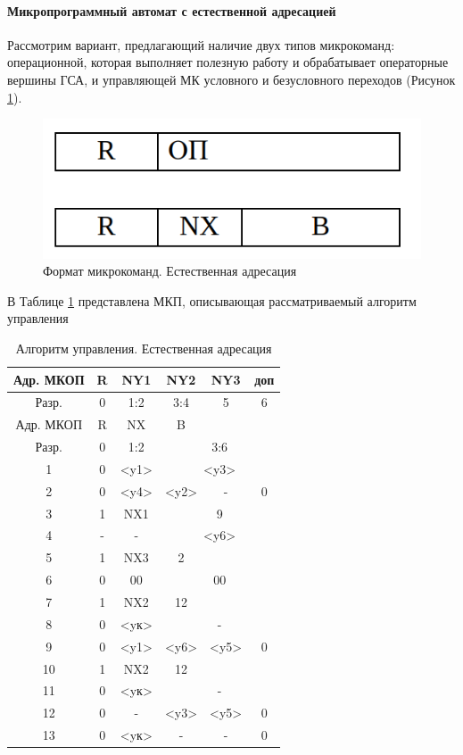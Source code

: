 \documentclass[a4paper,14pt]{extarticle}
\begin{document}
	
	\newpage
	\paragraph{Микропрограммный автомат с естественной адресацией}
	Рассмотрим вариант, предлагающий наличие двух типов микрокоманд: операционной, которая выполняет полезную работу и обрабатывает операторные
	вершины ГСА, и управляющей МК условного и безусловного переходов (Рисунок \ref{fig:mk-mix-nat}).
	
	\begin{figure}[h!]
		\centering
		\includegraphics[width=0.4\linewidth]{images/mk-mix-nat}
		\caption{Формат микрокоманд. Естественная адресация}
		\label{fig:mk-mix-nat}
	\end{figure}
	
	
	В Таблице \ref{tab:manage-algorithm2} представлена МКП, описывающая рассматриваемый алгоритм управления
	
	\begin{table}[htbp]
		\centering
		\begin{tabular}{|c|c|c|c|c|c|}
			\hline
			Адр. МКОП & R & NY1 & NY2 & NY3 & доп \\ \hline
			Разр. & 0 & 1:2 & 3:4 & 5 & 6 \\ \hline
			Адр. МКОП & R & NX & B &  &  \\ \hline
			Разр. & 0 & 1:2 & \multicolumn{ 3}{c|}{3:6} \\ \hline\hline
			1 & 0 & <y1> & \multicolumn{ 3}{c|}{<y3>} \\ \hline
			2 & 0 & <y4> & <y2> & - & 0 \\ \hline
			3 & 1 & NX1 & \multicolumn{ 3}{c|}{9}  \\ \hline
			4 & - & - & \multicolumn{ 3}{c|}{<y6>} \\ \hline
			5 & 1 & NX3 & 2 &  &  \\ \hline
			6 & 0 & 00 & \multicolumn{ 3}{c|}{00} \\ \hline
			7 & 1 & NX2 & 12 &  &  \\ \hline
			8 & 0 & <yк> & \multicolumn{ 3}{c|}{-} \\ \hline
			9 & 0 & <y1> & <y6> & <y5> & 0 \\ \hline
			10 & 1 & NX2 & 12 &  &  \\ \hline
			11 & 0 & <yк> & \multicolumn{ 3}{c|}{-} \\ \hline
			12 & 0 & - & <y3> & <y5> & 0 \\ \hline
			13 & 0 & <yк> & - & - & 0 \\ \hline
		\end{tabular}
		\caption{Алгоритм управления. Естественная адресация }
		\label{tab:manage-algorithm2}
	\end{table}
	
\end{document}
